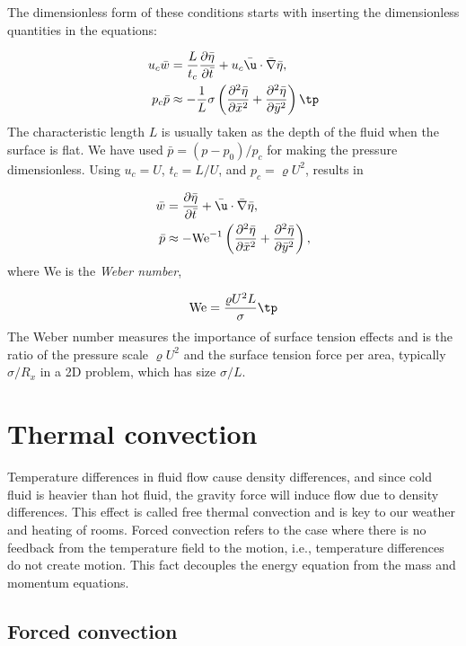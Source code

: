 \documentclass[graybox,envcountchap,sectrefs,final]{svmonodo}
\begin{document}
The dimensionless form of these conditions starts with inserting the
dimensionless quantities in the equations:

\begin{align*}
u_c\bar w &= \frac{L}{t_c}
\frac{\partial\bar\eta}{\partial\bar t} +
u_c\bar\u\cdot\bar\nabla\bar\eta,\\ 
p_c \bar p &\approx
-\frac{1}{L}\sigma\left(\frac{\partial^2\bar\eta}{\partial \bar x^2} +
\frac{\partial^2\bar\eta}{\partial \bar y^2}\right)\tp
\end{align*}
The characteristic length $L$ is usually taken as the depth of the fluid
when the surface is flat. We have used
$\bar p = (p - p_0)/p_c$ for making the pressure dimensionless.
Using $u_c=U$, $t_c=L/U$, and $p_c = \varrho U^2$, results in

\begin{align}
\bar w &= \frac{\partial\bar\eta}{\partial\bar t} +
\bar\u\cdot\bar\nabla\bar\eta,\\ 
\bar p &\approx
- \hbox{We}^{-1}\left(\frac{\partial^2\bar\eta}{\partial \bar x^2} +
\frac{\partial^2\bar\eta}{\partial \bar y^2}\right),
\label{scale:fluid:NS:surface_tension2}
\end{align}
where We is the \emph{Weber number},

\begin{equation}
\hbox{We} = \frac{\varrho U^2L}{\sigma}\tp
\end{equation}
The Weber number measures the importance of surface tension effects and
is the ratio of the pressure scale $\varrho U^2$ and the surface
tension force per area, typically $\sigma/R_x$ in a 2D problem, which
has size $\sigma/L$.

\section{Thermal convection}

Temperature differences in fluid flow cause density differences, and since
cold fluid is heavier than hot fluid, the gravity force will induce
flow due to density differences. This effect is called free thermal
convection and is key to our weather and heating of rooms.
Forced convection refers to the case where there is no
feedback from the temperature field to the motion, i.e., temperature
differences do not create motion. This fact decouples the energy
equation from the mass and momentum equations.

\subsection{Forced convection}
\end{document}
